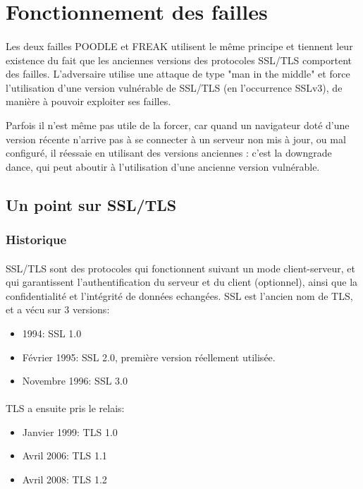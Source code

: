\section{Fonctionnement des failles}

\paragraph{}
Les deux failles POODLE et FREAK utilisent le m\^eme principe et tiennent leur existence du fait que les anciennes versions des protocoles SSL/TLS comportent des failles. L'adversaire utilise une attaque de type "man in the middle" et force l'utilisation d'une version vulnérable de SSL/TLS (en l'occurrence SSLv3), de manière à pouvoir exploiter ses failles. 

Parfois il n'est m\^eme pas utile de la forcer, car quand un navigateur doté d’une version récente n’arrive pas à se connecter à un serveur non mis à jour, ou mal configuré, il réessaie en utilisant des versions anciennes : c’est la downgrade dance, qui peut aboutir à l'utilisation d'une ancienne version vulnérable.

\subsection{Un point sur SSL/TLS}

\subsubsection{Historique}

\paragraph{}
SSL/TLS sont des protocoles qui fonctionnent suivant un mode client-serveur, et qui garantissent l'authentification du serveur et du client (optionnel), ainsi que la confidentialité et l'intégrité de données echangées. SSL est l'ancien nom de TLS, et a vécu sur 3 versions:
\begin{itemize}
\item 1994: SSL 1.0
\item Février 1995: SSL 2.0, première version réellement utilisée.
\item Novembre 1996: SSL 3.0 
\end{itemize}

\paragraph{}
TLS a ensuite pris le relais: 
\begin{itemize}
\item Janvier 1999: TLS 1.0
\item Avril 2006: TLS 1.1
\item Avril 2008: TLS 1.2
\end{itemize}

